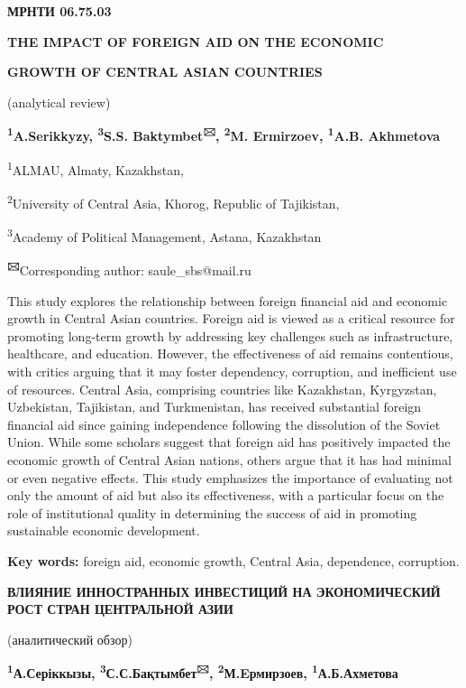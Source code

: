 


\newpage
{\bfseries МРНТИ 06.75.03}

{\bfseries THE IMPACT OF FOREIGN AID ON THE ECONOMIC}

{\bfseries GROWTH OF CENTRAL ASIAN COUNTRIES}

(analytical review)

{\bfseries \textsuperscript{1}A.Serikkyzy, \textsuperscript{3}S.S.
Baktymbet\textsuperscript{🖂}, \textsuperscript{2}M. Ermirzoev,
\textsuperscript{1}A.B. Akhmetova}

\textsuperscript{1}ALMAU, Almaty, Kazakhstan,

\textsuperscript{2}University of Central Asia, Khorog, Republic of
Tajikistan,

\textsuperscript{3}Academy of Political Management, Astana, Kazakhstan

{\bfseries \textsuperscript{🖂}}Corresponding author: saule\_sbs@mail.ru

This study explores the relationship between foreign financial aid and
economic growth in Central Asian countries. Foreign aid is viewed as a
critical resource for promoting long-term growth by addressing key
challenges such as infrastructure, healthcare, and education. However,
the effectiveness of aid remains contentious, with critics arguing that
it may foster dependency, corruption, and inefficient use of resources.
Central Asia, comprising countries like Kazakhstan, Kyrgyzstan,
Uzbekistan, Tajikistan, and Turkmenistan, has received substantial
foreign financial aid since gaining independence following the
dissolution of the Soviet Union. While some scholars suggest that
foreign aid has positively impacted the economic growth of Central Asian
nations, others argue that it has had minimal or even negative effects.
This study emphasizes the importance of evaluating not only the amount
of aid but also its effectiveness, with a particular focus on the role
of institutional quality in determining the success of aid in promoting
sustainable economic development.

{\bfseries Key words:} foreign aid, economic growth, Central Asia,
dependence, corruption.

{\bfseries ВЛИЯНИЕ ИННОСТРАННЫХ ИНВЕСТИЦИЙ НА ЭКОНОМИЧЕСКИЙ РОСТ СТРАН
ЦЕНТРАЛЬНОЙ АЗИИ}

(аналитический обзор)

{\bfseries \textsuperscript{1}А.Серіккызы,
\textsuperscript{3}С.С.Бақтымбет\textsuperscript{🖂},
\textsuperscript{2}М.Eрмирзоев, \textsuperscript{1}А.Б.Ахметова}

